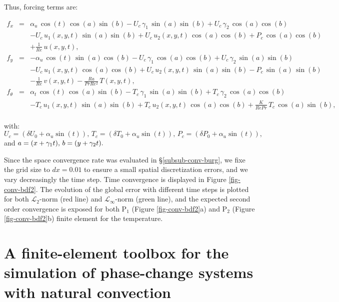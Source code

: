 \noindent Thus, forcing terms are:

\begin{eqnarray}
	f_x &=& \alpha_u \, \cos(t) \, \cos(a) \sin(b) - U_c \, \gamma_1 \, \sin(a) \sin(b) + U_c \, \gamma_2  \, \cos(a)\cos(b) \\ \nonumber
	  & & - U_c \,  u_1(x,y,t) \, \sin(a) \sin(b) + U_c \,  u_2(x,y,t) \, \cos(a) \cos(b)
	  + P_c \, \cos(a) \cos(b)\\ \nonumber
	  & & + \frac{1}{Re} \, u(x,y,t), \\	  \nonumber
	f_y &=& - \alpha_u \,  \cos(t)  \, \sin(a) \cos(b) - U_c \,  \gamma_1  \,  \cos(a) \cos(b) + U_c \,  \gamma_2 \,  \sin(a)\sin(b) \\ \nonumber
		  & & - U_c \,  u_1(x,y,t)  \,  \cos(a) \cos(b) + U_c  \, u_2(x,y,t)  \,  \sin(a) \sin(b)
		  -  P_c  \,  \sin(a)  \,  \sin(b)\\ \nonumber
		  & & -\frac{1}{Re} \,  v(x,y,t)
		  - \frac{Ra}{Pr Re^2} \,  T(x,y,t), \\  \nonumber
	f_{\theta} &=& \alpha_t \,  \cos(t) \,  \cos(a) \sin(b) -  T_c  \,  \gamma_1 \,  \sin(a) \sin(b) + T_c \,   \gamma_2  \,  \cos(a)\cos(b) \\ \nonumber
		  & &-  T_c \,  u_1(x,y,t)  \,  \sin(a) \sin(b)  
		  +   T_c  \,  u_2(x,y,t)  \, \cos(a) \cos(b) 
		  + \frac{K}{Re Pr} \,  T_c  \, \cos(a) \sin(b), \\ \nonumber
\end{eqnarray}

with: 
$	U_c = (\delta U_0 + \alpha_u \sin(t)), \,
	T_c = (\delta T_0 + \alpha_u \sin(t)), \,
	P_c = (\delta P_0 + \alpha_u \sin(t)), $ \\
and $	a = (x+ \gamma_1 t), \,
	b = (y+ \gamma_2 t). \\$

Since the space convergence rate was evaluated in \S \ref{subsub-conv-burg}, we fixe the grid size to $dx = 0.01$ to ensure a small spatial discretization errors, and we vary decreasingly the time step.
Time convergence is displayed in Figure \ref{fig-conv-bdf2}. 
The evolution of the global error with different time steps is plotted for both  $\mathcal{L}_2$-norm (red line) and $\mathcal{L}_\infty$-norm (green line), and the expected second order convergence is exposed for both P$_1$ (Figure \ref{fig-conv-bdf2}a) and P$_2$ (Figure \ref{fig-conv-bdf2}b) finite element for the temperature.

\section{A finite-element toolbox for the simulation of phase-change systems with natural convection}\label{sec-desc-prog}

